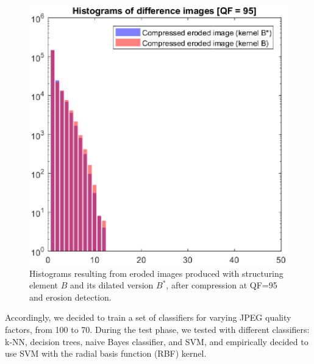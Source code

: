 \documentclass[review]{elsarticle}
\begin{document}
\begin{figure}[t!]
	\centering
	\includegraphics[scale=0.55]{hist_ero_ero_albero.eps}
	\caption{Histograms resulting from eroded images produced with structuring element $B$ and its dilated version $B^*$, after compression at QF=95 and erosion detection.}
	\label{fig:hist_ero_ero_albero}
\end{figure}

Accordingly, we decided to train a set of classifiers for varying JPEG quality factors, from 100 to 70. During the test phase, we tested with different classifiers: k-NN, decision trees, naive Bayes classifier, and SVM, and empirically decided to use SVM with the radial basis function (RBF) kernel. 
\end{document}
